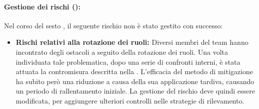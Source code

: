\paragraph*{Gestione dei rischi ():}
\par Nel corso del sesto , il seguente rischio non è stato gestito con successo:
\begin{itemize}
  \item \textbf{Rischi relativi alla rotazione dei ruoli:} Diversi membri del team hanno incontrato degli ostacoli a seguito della rotazione dei ruoli. Una volta individuata tale problematica, dopo una serie di confronti interni, è stata attuata la contromisura descritta nella . L'efficacia del metodo di mitigazione ha subito però una riduzione a causa della sua applicazione tardiva, causando un periodo di rallentamento iniziale. La gestione del rischio deve quindi essere modificata, per aggiungere ulteriori controlli nelle strategie di rilevamento.
\end{itemize}